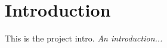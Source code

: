 \chapter{Introduction}
\label{chapter:introduction}
This is the project intro.
\emph{An introduction... \cite{example-article}}

\cite{sysid-nn}